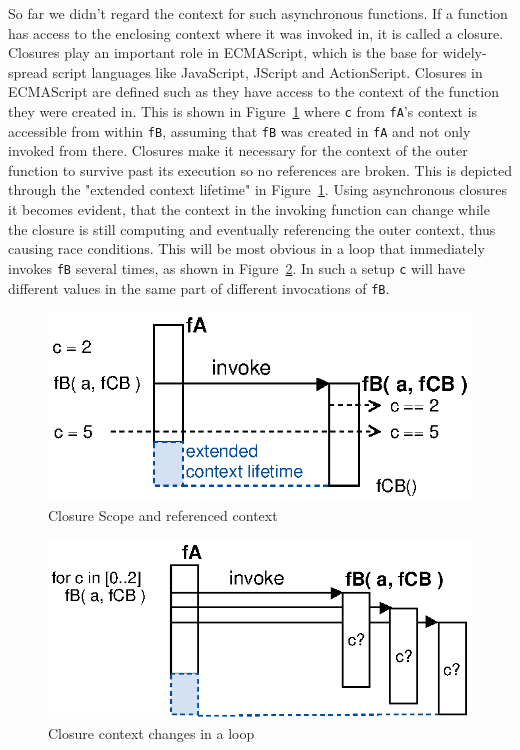 So far we didn't regard the context for such asynchronous functions.
If a function has access to the enclosing context where it was invoked in, it is called a closure.
Closures play an important role in ECMAScript\cite{EcmaScript}, which is the base for widely-spread script languages like JavaScript, JScript and ActionScript.
Closures in ECMAScript\cite{EcmaScript} are defined such as they have access to the context of the function they were created in.
This is shown in Figure~\ref{fig:Closures_Closure-1} where \texttt{c} from \texttt{fA}'s context is accessible from within \texttt{fB}, assuming that \texttt{fB} was created in \texttt{fA} and not only invoked from there.
Closures make it necessary for the context of the outer function to survive past its execution so no references are broken.
This is depicted through the "extended context lifetime" in Figure~\ref{fig:Closures_Closure-1}.
Using asynchronous closures it becomes evident, that the context in the invoking function can change while the closure is still computing and eventually referencing the outer context, thus causing race conditions.
This will be most obvious in a loop that immediately invokes \texttt{fB} several times, as shown in Figure~\ref{fig:Closures_Closure-2}.
In such a setup \texttt{c} will have different values in the same part of different invocations of \texttt{fB}.
\begin{figure}[!ht]
	\centering
  \includegraphics{figures/Closures_Closure-1}
	\caption{Closure Scope and referenced context}
	\label{fig:Closures_Closure-1}
\end{figure}
\begin{figure}[!ht]
	\centering
  \includegraphics{figures/Closures_Closure-2}
	\caption{Closure context changes in a loop}
	\label{fig:Closures_Closure-2}
\end{figure}


